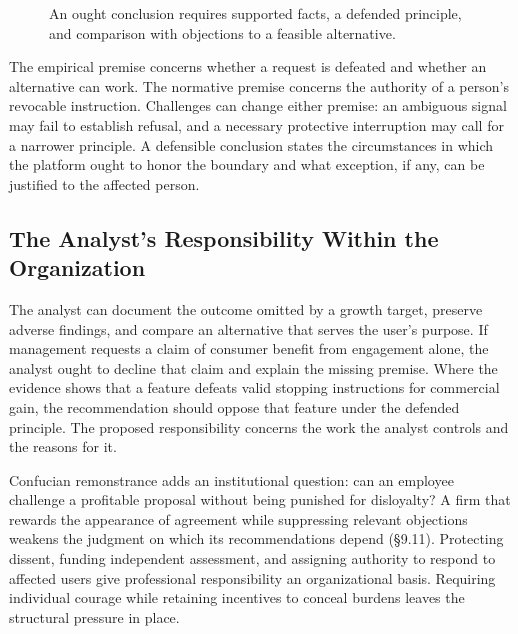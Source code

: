 \begin{figure}[htbp]
\centering

\caption{An ought conclusion requires supported facts, a defended principle, and comparison with objections to a feasible alternative.}\label{fig:M09_engagement_reasons}
\end{figure}

The empirical premise concerns whether a request is defeated and whether
an alternative can work. The normative premise concerns the authority of
a person's revocable instruction. Challenges can change either premise:
an ambiguous signal may fail to establish refusal, and a necessary
protective interruption may call for a narrower principle. A defensible
conclusion states the circumstances in which the platform ought to honor
the boundary and what exception, if any, can be justified to the
affected person.

\hypertarget{M09-the-analysts-responsibility-within-the-organization}{%
\subsection{The Analyst's Responsibility Within the
Organization}\label{M09-the-analysts-responsibility-within-the-organization}}

\noindent \noindent The analyst can document the outcome omitted by a growth
target, preserve adverse findings, and compare an alternative that
serves the user's purpose. If management requests a claim of consumer
benefit from engagement alone, the analyst ought to decline that claim
and explain the missing premise. Where the evidence shows that a feature
defeats valid stopping instructions for commercial gain, the
recommendation should oppose that feature under the defended principle.
The proposed responsibility concerns the work the analyst controls and
the reasons for it.

Confucian remonstrance adds an institutional question: can an employee
challenge a profitable proposal without being punished for disloyalty? A
firm that rewards the appearance of agreement while suppressing relevant
objections weakens the judgment on which its recommendations depend
(§9.11). Protecting dissent, funding independent assessment, and
assigning authority to respond to affected users give professional
responsibility an organizational basis. Requiring individual courage
while retaining incentives to conceal burdens leaves the structural
pressure in place.


